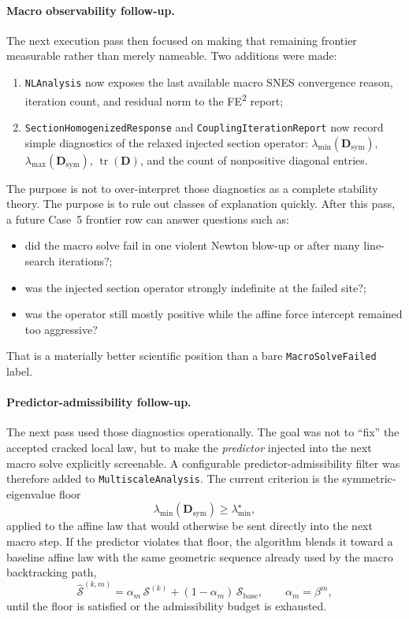 \paragraph{Macro observability follow-up.}
The next execution pass then focused on making that remaining frontier
measurable rather than merely nameable.  Two additions were made:
\begin{enumerate}
  \item \texttt{NLAnalysis} now exposes the last available macro SNES
    convergence reason, iteration count, and residual norm to the FE\textsuperscript{2}
    report;
  \item \texttt{SectionHomogenizedResponse} and
    \texttt{CouplingIterationReport} now record simple diagnostics of the
    relaxed injected section operator:
    \(\lambda_{\min}(\mathbf{D}_{\mathrm{sym}})\),
    \(\lambda_{\max}(\mathbf{D}_{\mathrm{sym}})\),
    \(\operatorname{tr}(\mathbf{D})\), and the count of nonpositive diagonal
    entries.
\end{enumerate}

The purpose is not to over-interpret those diagnostics as a complete stability
theory.  The purpose is to rule out classes of explanation quickly.  After this
pass, a future Case~5 frontier row can answer questions such as:
\begin{itemize}
  \item did the macro solve fail in one violent Newton blow-up or after many
    line-search iterations?;
  \item was the injected section operator strongly indefinite at the failed
    site?;
  \item was the operator still mostly positive while the affine force intercept
    remained too aggressive?
\end{itemize}
That is a materially better scientific position than a bare
\texttt{MacroSolveFailed} label.

\paragraph{Predictor-admissibility follow-up.}
The next pass used those diagnostics operationally.  The goal was not to
``fix'' the accepted cracked local law, but to make the \emph{predictor}
injected into the next macro solve explicitly screenable.  A configurable
predictor-admissibility filter was therefore added to
\texttt{MultiscaleAnalysis}.  The current criterion is the symmetric-eigenvalue
floor
\[
  \lambda_{\min}\!\left(\mathbf{D}_{\mathrm{sym}}\right)
  \ge \lambda_{\min}^{\star},
\]
applied to the affine law that would otherwise be sent directly into the next
macro step.  If the predictor violates that floor, the algorithm blends it
toward a baseline affine law with the same geometric sequence already used by
the macro backtracking path,
\[
  \widehat{\mathcal{S}}^{(k,m)}
  = \alpha_m\,\mathcal{S}^{(k)}
  + (1-\alpha_m)\,\mathcal{S}_{\mathrm{base}},
  \qquad
  \alpha_m = \beta^m,
\]
until the floor is satisfied or the admissibility budget is exhausted.

